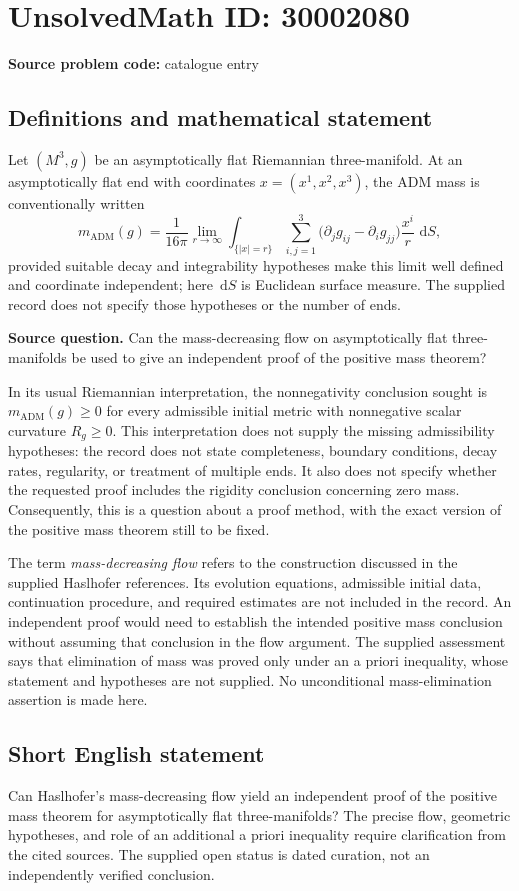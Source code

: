 \documentclass[11pt]{article}
\newcommand{\dd}{\,\mathrm{d}}
\begin{document}
\section*{UnsolvedMath ID: 30002080}
\textbf{Source problem code:} catalogue entry
\subsection{Definitions and mathematical statement}
Let \((M^3,g)\) be an asymptotically flat Riemannian three-manifold. At an asymptotically flat end with coordinates \(x=(x^1,x^2,x^3)\), the ADM mass is conventionally written
\[
m_{\mathrm{ADM}}(g)=\frac{1}{16\pi}\lim_{r\to\infty}\int_{\{|x|=r\}}\sum_{i,j=1}^{3}\bigl(\partial_j g_{ij}-\partial_i g_{jj}\bigr)\frac{x^i}{r}\,\dd S,
\]
provided suitable decay and integrability hypotheses make this limit well defined and coordinate independent; here \(\dd S\) is Euclidean surface measure. The supplied record does not specify those hypotheses or the number of ends.

\textbf{Source question.} Can the mass-decreasing flow on asymptotically flat three-manifolds be used to give an independent proof of the positive mass theorem?

In its usual Riemannian interpretation, the nonnegativity conclusion sought is \(m_{\mathrm{ADM}}(g)\geq 0\) for every admissible initial metric with nonnegative scalar curvature \(R_g\geq 0\). This interpretation does not supply the missing admissibility hypotheses: the record does not state completeness, boundary conditions, decay rates, regularity, or treatment of multiple ends. It also does not specify whether the requested proof includes the rigidity conclusion concerning zero mass. Consequently, this is a question about a proof method, with the exact version of the positive mass theorem still to be fixed.

The term \emph{mass-decreasing flow} refers to the construction discussed in the supplied Haslhofer references. Its evolution equations, admissible initial data, continuation procedure, and required estimates are not included in the record. An independent proof would need to establish the intended positive mass conclusion without assuming that conclusion in the flow argument. The supplied assessment says that elimination of mass was proved only under an a priori inequality, whose statement and hypotheses are not supplied. No unconditional mass-elimination assertion is made here.
\subsection{Short English statement}
Can Haslhofer's mass-decreasing flow yield an independent proof of the positive mass theorem for asymptotically flat three-manifolds? The precise flow, geometric hypotheses, and role of an additional a priori inequality require clarification from the cited sources. The supplied open status is dated curation, not an independently verified conclusion.
\end{document}
